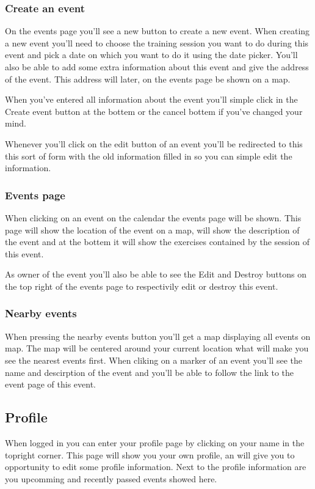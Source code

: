 \documentclass[11pt,a4paper]{scrartcl}
\begin{document}
\subsubsection{Create an event}
On the events page you'll see a new button to create a new event. When creating a new event you'll need to choose the training session
you want to do during this event and pick a date on which you want to do it using the date picker. You'll also be able to add some extra
information about this event and give the address of the event. This address will later, on the events page be shown on a map.

When you've entered all information about the event you'll simple click in the Create event button at the bottem or the cancel bottem
if you've changed your mind.

Whenever you'll click on the edit button of an event you'll be redirected to this this sort of form with the old information filled in
so you can simple edit the information.
\subsubsection{Events page}
When clicking on an event on the calendar the events page will be shown. This page will show the location of the event on a map, will
show the description of the event and at the bottem it will show the exercises contained by the session of this event.

As owner of the event you'll also be able to see the Edit and Destroy buttons on the top right of the events page to respectivily edit 
or destroy this event.
\subsubsection{Nearby events}
When pressing the nearby events button you'll get a map displaying all events on map. The map will be centered around your current location
what will make you see the nearest events first. When cliking on a marker of an event you'll see the name and descirption of the event
and you'll be able to follow the link to the event page of this event.

\subsection{Profile}
When logged in you can enter your profile page by clicking on your name in the topright corner. This page will show you your own profile, an will 
give you to opportunity to edit some profile information. Next to the profile information are you upcomming and recently passed events showed here.
\end{document}
